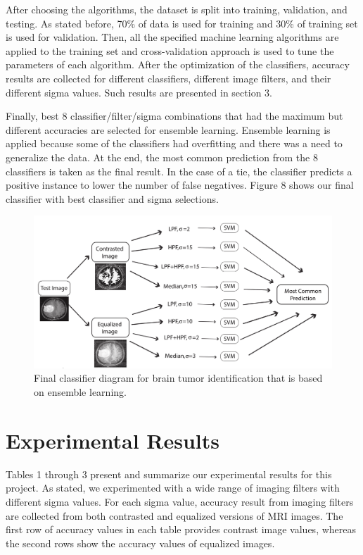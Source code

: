 \documentclass[conference]{IEEEtran}
\begin{document}
After choosing the algorithms, the dataset is split into training, validation, and testing. As stated before, 70\% of data is used for training and 30\% of training set is used for validation. Then, all the specified machine learning algorithms are applied to the training set and cross-validation approach is used to tune the parameters of each algorithm. After the optimization of the classifiers, accuracy results are collected for different classifiers, different image filters, and their different sigma values. Such results are presented in section 3. 

Finally, best 8 classifier/filter/sigma combinations that had the maximum but different accuracies are selected for ensemble learning. Ensemble learning is applied because some of the classifiers had overfitting and there was a need to generalize the data. At the end, the most common prediction from the 8 classifiers is taken as the final result. In the case of a tie, the classifier predicts a positive instance to lower the number of false negatives. Figure 8 shows our final classifier with best classifier and sigma selections.

\begin{figure}[h]
\centering
\includegraphics[scale=0.1]{final_classifier_diagram}
\caption{Final classifier diagram for brain tumor identification that is based on ensemble learning.}
\end{figure}

\section{Experimental Results}\label{results}
Tables 1 through 3 present and summarize our experimental results for this project. As stated, we experimented with a wide range of imaging filters with different sigma values. For each sigma value, accuracy result from imaging filters are collected from both contrasted and equalized versions of MRI images. The first row of accuracy values in each table provides contrast image values, whereas the second rows show the accuracy values of equalized images. 
\end{document}
